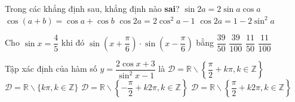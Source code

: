 \begin{ex}%
Trong các khẳng định sau, khẳng định nào \textbf{sai}?
\choice
{$\sin 2 a=2 \sin a \cos a$}
{\True $\cos (a+b)=\cos a+\cos b$}
{$\cos 2 a=2 \cos ^2 a-1$}
{$\cos 2 a=1-2 \sin ^2 a$}
\end{ex}

\begin{ex}%
Cho $\sin x=\dfrac{4}{5}$ khi đó $\sin \left(x+\dfrac{\pi}{6}\right) \cdot \sin \left(x-\dfrac{\pi}{6}\right)$ bằng
\choice
{$\dfrac{39}{50}$}
{\True $\dfrac{39}{100}$}
{$\dfrac{11}{50}$}
{$\dfrac{11}{100}$}
\end{ex}



\begin{ex}%
Tập xác định của hàm số $y=\dfrac{2 \cos x+3}{\sin ^2 x-1}$ là
\choice
{\True $\mathscr{D}=\mathbb{R} \backslash\left\{\dfrac{\pi}{2}+k \pi, k \in \mathbb{Z}\right\}$}
{$\mathscr{D}=\mathbb{R} \backslash\{k \pi, k \in \mathbb{Z}\}$}
{$\mathscr{D}=\mathbb{R} \backslash\left\{-\dfrac{\pi}{2}+k 2 \pi, k \in \mathbb{Z}\right\}$}
{$\mathscr{D}=\mathbb{R} \backslash\left\{\dfrac{\pi}{2}+k 2 \pi, k \in \mathbb{Z}\right\}$}
\end{ex}


